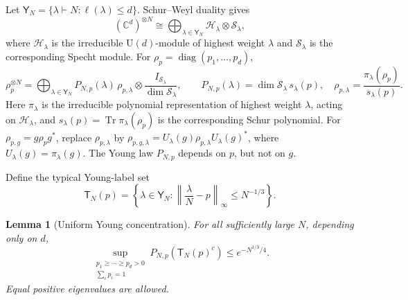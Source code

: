 \documentclass[11pt]{article}
\newtheorem{lemma}[lemma]{Lemma}
\theoremstyle{remark}
\theoremstyle{plain}
\newcommand{\C}{\mathbb C}
\newcommand{\cH}{\mathcal H}
\newcommand{\cS}{\mathcal S}
\newcommand{\U}{\mathrm U}
\newcommand{\diag}{\operatorname{diag}}
\newcommand{\Tr}{\operatorname{Tr}}
\newcommand{\ot}{\otimes}
\begin{document}
Let $\mathsf Y_N=\{\lambda\vdash N:\ell(\lambda)\le d\}$.  Schur--Weyl duality gives
\begin{equation}\label{eq:schur-weyl-decomposition}
  (\C^d)^{\ot N}
  \cong
  \bigoplus_{\lambda\in\mathsf Y_N}\cH_\lambda\ot\cS_\lambda,
\end{equation}
where \(\cH_\lambda\) is the irreducible \(\U(d)\)-module of highest
weight \(\lambda\) and \(\cS_\lambda\) is the corresponding Specht module.
For \(\rho_p=\diag(p_1,\ldots,p_d)\),
\begin{equation}\label{eq:schur-state}
  \rho_p^{\ot N}
  =\bigoplus_{\lambda\in\mathsf Y_N}
  P_{N,p}(\lambda)\,
  \rho_{p,\lambda}\ot\frac{I_{\cS_\lambda}}{\dim\cS_\lambda},
  \qquad
  P_{N,p}(\lambda)=\dim\cS_\lambda\,s_\lambda(p),
  \quad
  \rho_{p,\lambda}=\frac{\pi_\lambda(\rho_p)}{s_\lambda(p)}.
\end{equation}
Here \(\pi_\lambda\) is the irreducible polynomial representation of highest
weight \(\lambda\), acting on \(\cH_\lambda\), and
\(s_\lambda(p)=\Tr\pi_\lambda(\rho_p)\) is the corresponding Schur
polynomial.  For \(\rho_{p,g}=g\rho_p g^*\), replace \(\rho_{p,\lambda}\) by
\(\rho_{p,g,\lambda}=U_\lambda(g)\rho_{p,\lambda}U_\lambda(g)^*\), where
\(U_\lambda(g)=\pi_\lambda(g)\).  The
Young law \(P_{N,p}\) depends on \(p\), but not on \(g\).

Define the typical Young-label set
\begin{equation}\label{eq:young-typical-set}
  \mathsf T_N(p)
  =\left\{\lambda\in\mathsf Y_N:
  \left\|\frac\lambda N-p\right\|_\infty\le N^{-1/3}\right\}.
\end{equation}

\begin{lemma}[Uniform Young concentration]\label{lem:young-concentration}
For all sufficiently large \(N\), depending only on \(d\),
\begin{equation}\label{eq:uniform-young-concentration}
  \sup_{\substack{p_1\ge\cdots\ge p_d>0\\\sum_i p_i=1}}
  P_{N,p}(\mathsf T_N(p)^c)
  \le e^{-N^{1/3}/4}.
\end{equation}
Equal positive eigenvalues are allowed.
\end{lemma}
\end{document}
